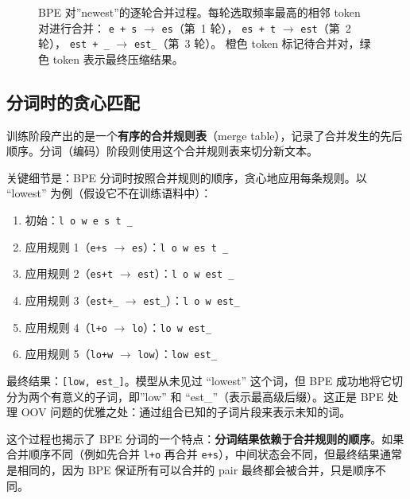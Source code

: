 \begin{figure}[htbp]
\caption{BPE 对”newest”的逐轮合并过程。每轮选取频率最高的相邻 token 对进行合并：
\texttt{e\,+\,s} $\to$ \texttt{es}（第~1 轮），
\texttt{es\,+\,t} $\to$ \texttt{est}（第~2 轮），
\texttt{est\,+\,\_} $\to$ \texttt{est\_}（第~3 轮）。
橙色 token 标记待合并对，绿色 token 表示最终压缩结果。}
\label{fig:bpe-merge}
\end{figure}

\subsection{分词时的贪心匹配}

训练阶段产出的是一个\textbf{有序的合并规则表}（merge table），记录了合并发生的先后顺序。分词（编码）阶段则使用这个合并规则表来切分新文本。

关键细节是：BPE 分词时按照合并规则的顺序，贪心地应用每条规则。以 “lowest” 为例（假设它不在训练语料中）：

\begin{enumerate}[noitemsep]
  \item 初始：\texttt{l o w e s t \_}
  \item 应用规则 1（\texttt{e+s} $\to$ \texttt{es}）：\texttt{l o w es t \_}
  \item 应用规则 2（\texttt{es+t} $\to$ \texttt{est}）：\texttt{l o w est \_}
  \item 应用规则 3（\texttt{est+\_} $\to$ \texttt{est\_}）：\texttt{l o w est\_}
  \item 应用规则 4（\texttt{l+o} $\to$ \texttt{lo}）：\texttt{lo w est\_}
  \item 应用规则 5（\texttt{lo+w} $\to$ \texttt{low}）：\texttt{low est\_}
\end{enumerate}

最终结果：\texttt{[low, est\_]}。模型从未见过 “lowest” 这个词，但 BPE 成功地将它切分为两个有意义的子词，即”low” 和 “est\_”（表示最高级后缀）。这正是 BPE 处理 OOV 问题的优雅之处：通过组合已知的子词片段来表示未知的词。

这个过程也揭示了 BPE 分词的一个特点：\textbf{分词结果依赖于合并规则的顺序}。如果合并顺序不同（例如先合并 \texttt{l+o} 再合并 \texttt{e+s}），中间状态会不同，但最终结果通常是相同的，因为 BPE 保证所有可以合并的 pair 最终都会被合并，只是顺序不同。

